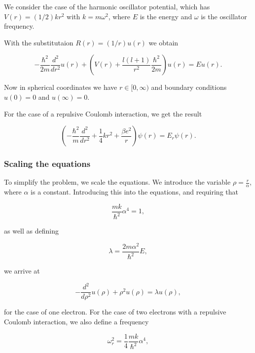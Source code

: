\documentclass{emulateapj}
\begin{document}
We consider the case of the harmonic oscillator potential, which has $V(r) = (1/2)kr^2$ with $k=m\omega^2$, where $E$ is the energy and $\omega$ is the oscillator frequency.

With the substitutaion $R(r) = (1/r) u(r)$ we obtain

\begin{equation}
  -\frac{\hbar^2}{2 m} \frac{d^2}{dr^2} u(r)
       + \left ( V(r) + \frac{l (l + 1)}{r^2}\frac{\hbar^2}{2 m}
                                    \right ) u(r)  = E u(r) .
\end{equation}

Now in spherical coordinates we have $r\in [0,\infty)$ and boundary conditions $u(0)=0$ and $u(\infty)=0$.

For the case of a repulsive Coulomb interaction, we get the result

\begin{equation}
\left(  -\frac{\hbar^2}{m} \frac{d^2}{dr^2}+ \frac{1}{4}k r^2+\frac{\beta e^2}{r}\right)\psi(r)  = E_r \psi(r).
\end{equation}

\subsubsection{Scaling the equations}
To simplify the problem, we scale the equations. We introduce the variable $\rho = \frac{r}{\alpha}$, where $\alpha$ is a constant. Introducing this into the equations, and requiring that

\begin{equation}
\frac{mk}{\hbar^2} \alpha^4 = 1,
\end{equation}

 as well as defining

 \begin{equation}
\lambda = \frac{2m\alpha^2}{\hbar^2}E,
\end{equation}

we arrive at

\begin{equation}
  -\frac{d^2}{d\rho^2} u(\rho) + \rho^2u(\rho)  = \lambda u(\rho),
\end{equation}

for the case of one electron. For the case of two electrons with a repulsive Coulomb interaction, we also define a frequency

\begin{equation}
\omega_r^2=\frac{1}{4}\frac{mk}{\hbar^2} \alpha^4,
\end{equation}
\end{document}

